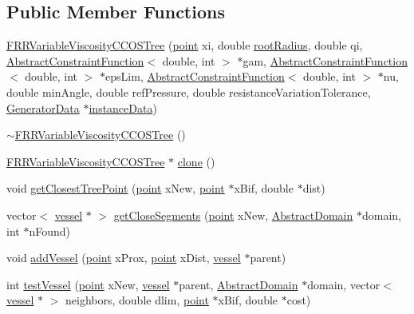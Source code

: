 \subsection*{Public Member Functions}
\begin{DoxyCompactItemize}
\item 
\hyperlink{class_f_r_r_variable_viscosity_c_c_o_s_tree_a112b1f39ea3592953d942d543f0b01fc}{F\+R\+R\+Variable\+Viscosity\+C\+C\+O\+S\+Tree} (\hyperlink{structpoint}{point} xi, double \hyperlink{class_f_r_r_variable_viscosity_c_c_o_s_tree_a15338c59c6dbecaeaeab80577a22c877}{root\+Radius}, double qi, \hyperlink{class_abstract_constraint_function}{Abstract\+Constraint\+Function}$<$ double, int $>$ $\ast$gam, \hyperlink{class_abstract_constraint_function}{Abstract\+Constraint\+Function}$<$ double, int $>$ $\ast$eps\+Lim, \hyperlink{class_abstract_constraint_function}{Abstract\+Constraint\+Function}$<$ double, int $>$ $\ast$nu, double min\+Angle, double ref\+Pressure, double resistance\+Variation\+Tolerance, \hyperlink{class_generator_data}{Generator\+Data} $\ast$\hyperlink{class_abstract_structured_c_c_o_tree_af1836d7ed2156f3cf9cc311edfdc49b1}{instance\+Data})
\item 
\hyperlink{class_f_r_r_variable_viscosity_c_c_o_s_tree_a2a51aa3ff3987afce48759ea27f2fa28}{$\sim$\+F\+R\+R\+Variable\+Viscosity\+C\+C\+O\+S\+Tree} ()
\item 
\hyperlink{class_f_r_r_variable_viscosity_c_c_o_s_tree}{F\+R\+R\+Variable\+Viscosity\+C\+C\+O\+S\+Tree} $\ast$ \hyperlink{class_f_r_r_variable_viscosity_c_c_o_s_tree_ab443fe67f0da340099405a8bdb42dfb6}{clone} ()
\item 
void \hyperlink{class_f_r_r_variable_viscosity_c_c_o_s_tree_a224c64cbf18976f660a730c5af0b73a0}{get\+Closest\+Tree\+Point} (\hyperlink{structpoint}{point} x\+New, \hyperlink{structpoint}{point} $\ast$x\+Bif, double $\ast$dist)
\item 
vector$<$ \hyperlink{structvessel}{vessel} $\ast$ $>$ \hyperlink{class_f_r_r_variable_viscosity_c_c_o_s_tree_a41e4e3406e5f78d50d5e597bad4950cd}{get\+Close\+Segments} (\hyperlink{structpoint}{point} x\+New, \hyperlink{class_abstract_domain}{Abstract\+Domain} $\ast$domain, int $\ast$n\+Found)
\item 
void \hyperlink{class_f_r_r_variable_viscosity_c_c_o_s_tree_a494a10a964337b83827012bfc03af194}{add\+Vessel} (\hyperlink{structpoint}{point} x\+Prox, \hyperlink{structpoint}{point} x\+Dist, \hyperlink{structvessel}{vessel} $\ast$parent)
\item 
int \hyperlink{class_f_r_r_variable_viscosity_c_c_o_s_tree_a339a5849edafcc7d315472a3fbed7987}{test\+Vessel} (\hyperlink{structpoint}{point} x\+New, \hyperlink{structvessel}{vessel} $\ast$parent, \hyperlink{class_abstract_domain}{Abstract\+Domain} $\ast$domain, vector$<$ \hyperlink{structvessel}{vessel} $\ast$ $>$ neighbors, double dlim, \hyperlink{structpoint}{point} $\ast$x\+Bif, double $\ast$cost)

\end{DoxyCompactItemize}
